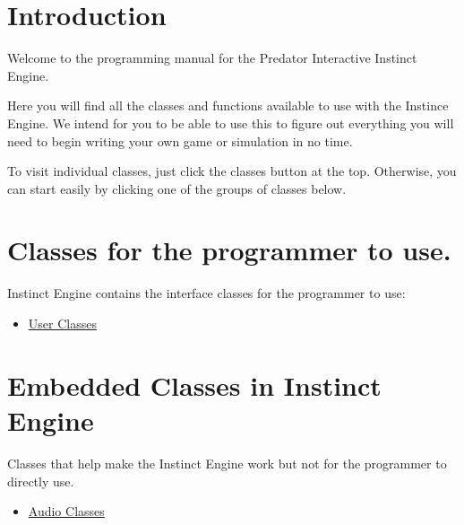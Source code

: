 \hypertarget{index_introSection}{}\section{Introduction}\label{index_introSection}
Welcome to the programming manual for the Predator Interactive Instinct Engine.

Here you will find all the classes and functions available to use with the Instince Engine. We intend for you to be able to use this to figure out everything you will need to begin writing your own game or simulation in no time.

To visit individual classes, just click the classes button at the top. Otherwise, you can start easily by clicking one of the groups of classes below.\hypertarget{index_moduleSection}{}\section{Classes for the programmer to use.}\label{index_moduleSection}
Instinct Engine contains the interface classes for the programmer to use: \begin{itemize}
\item \hyperlink{group__userclasses}{User Classes}\end{itemize}
\hypertarget{index_additionalSection}{}\section{Embedded Classes in Instinct Engine}\label{index_additionalSection}
Classes that help make the Instinct Engine work but not for the programmer to directly use. \begin{itemize}
\item \hyperlink{group__audioclasses}{Audio Classes} \end{itemize}
